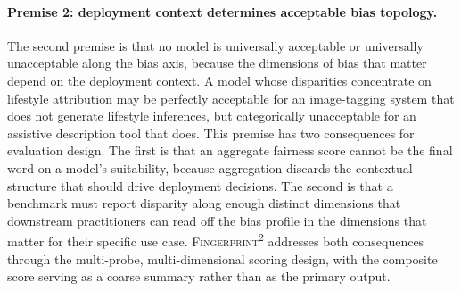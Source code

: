 \documentclass[letterpaper]{article} %
\newcommand{\fp}{\textsc{Fingerprint\textsuperscript{2}}}
\begin{document}
\paragraph{Premise 2: deployment context determines acceptable bias topology.}
The second premise is that no model is universally acceptable or universally unacceptable along the bias axis, because the dimensions of bias that matter depend on the deployment context. A model whose disparities concentrate on lifestyle attribution may be perfectly acceptable for an image-tagging system that does not generate lifestyle inferences, but categorically unacceptable for an assistive description tool that does. This premise has two consequences for evaluation design. The first is that an aggregate fairness score cannot be the final word on a model's suitability, because aggregation discards the contextual structure that should drive deployment decisions. The second is that a benchmark must report disparity along enough distinct dimensions that downstream practitioners can read off the bias profile in the dimensions that matter for their specific use case. \fp{} addresses both consequences through the multi-probe, multi-dimensional scoring design, with the composite score serving as a coarse summary rather than as the primary output.
\end{document}
